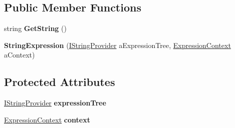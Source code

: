 \subsection*{Public Member Functions}
\begin{DoxyCompactItemize}
\item 
string {\bfseries Get\+String} ()\hypertarget{class_b83_1_1_logic_expression_parser_1_1_string_expression_a643c132ba101bc0ffcbf76b17436cc66}{}\label{class_b83_1_1_logic_expression_parser_1_1_string_expression_a643c132ba101bc0ffcbf76b17436cc66}

\item 
{\bfseries String\+Expression} (\hyperlink{interface_b83_1_1_logic_expression_parser_1_1_i_string_provider}{I\+String\+Provider} a\+Expression\+Tree, \hyperlink{class_b83_1_1_logic_expression_parser_1_1_expression_context}{Expression\+Context} a\+Context)\hypertarget{class_b83_1_1_logic_expression_parser_1_1_string_expression_a332ebb03b5ad165432724e85eb37da5f}{}\label{class_b83_1_1_logic_expression_parser_1_1_string_expression_a332ebb03b5ad165432724e85eb37da5f}

\end{DoxyCompactItemize}
\subsection*{Protected Attributes}
\begin{DoxyCompactItemize}
\item 
\hyperlink{interface_b83_1_1_logic_expression_parser_1_1_i_string_provider}{I\+String\+Provider} {\bfseries expression\+Tree}\hypertarget{class_b83_1_1_logic_expression_parser_1_1_string_expression_a51861174083edb475d9657c40a44adf4}{}\label{class_b83_1_1_logic_expression_parser_1_1_string_expression_a51861174083edb475d9657c40a44adf4}

\item 
\hyperlink{class_b83_1_1_logic_expression_parser_1_1_expression_context}{Expression\+Context} {\bfseries context}\hypertarget{class_b83_1_1_logic_expression_parser_1_1_string_expression_aa148052b24718db316f988fe26dec43d}{}\label{class_b83_1_1_logic_expression_parser_1_1_string_expression_aa148052b24718db316f988fe26dec43d}

\end{DoxyCompactItemize}
